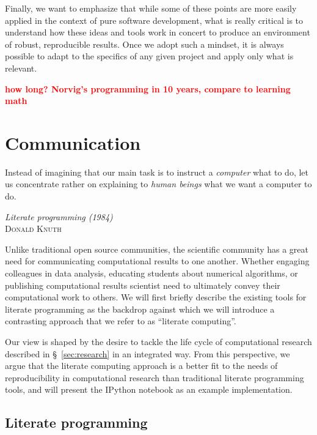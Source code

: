 \documentclass[ChapterTOCs,krantz2]{krantz} %
\newcommand{\fix}[1] { \textcolor{red} {
{\fbox{ {\bf Fix:} \ensuremath{\blacktriangleright }} {\bf #1}
\fbox{\ensuremath{\blacktriangleleft} } } } }
\begin{document}
Finally, we want to emphasize that while some of these points are more easily
applied in the context of pure software development, what is really critical is
to understand how these ideas and tools work in concert to produce an
environment of robust, reproducible results.  Once we adopt such a mindset, it
is always possible to adapt to the specifics of any given project and apply
only what is relevant.

\fix{how long? Norvig's programming in 10 years, compare to learning math}

\section{\label{sec:communication}Communication}

\setlength{\epigraphrule}{0pt}
\setlength{\epigraphwidth}{.90\textwidth}
\epigraph%
{%
Instead of imagining that our main task is to instruct a \emph{computer}
what to do, let us concentrate rather on explaining to \emph{human beings}
what we want a computer to do.
}%
{\textit{Literate programming (1984)}\\ \textsc{Donald Knuth} }

Unlike traditional open source communities, the scientific community has a
great need for communicating computational results to one another. Whether
engaging colleagues in data analysis, educating students about numerical
algorithms, or publishing computational results scientist need to ultimately
convey their computational work to others.  We will first briefly describe the
existing tools for literate programming as the backdrop against which we will
introduce a contrasting approach that we refer to as ``literate computing''.

Our view is shaped by the desire to tackle the life cycle of computational
research described in §~\ref{sec:research} in an integrated way.
From this perspective, we argue that the literate computing
approach is a better fit to the needs of reproducibility in computational
research than traditional literate programming tools, and will present the
IPython notebook as an example implementation.

\subsection{Literate programming}
\end{document}
